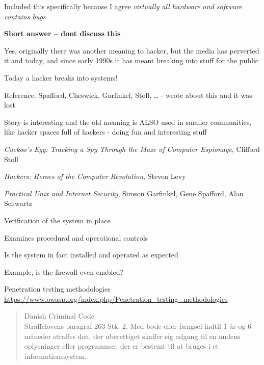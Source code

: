 \documentclass[Screen16to9,17pt]{foils}
\begin{document}
Included this specifically because I agree \emph{virtually all hardware and software contains bugs}





{\bfseries Short answer -- dont discuss this}

Yes, originally there was another meaning to hacker, but the media has perverted it and today, and since early 1990s it has meant breaking into stuff for the public

{\color{red}\hlkbig Today a hacker breaks into systems!}

Reference. Spafford, Cheswick, Garfinkel, Stoll, \ldots
- wrote about this and it was lost

Story is interesting and the old meaning is ALSO used in smaller communities, like hacker spaces full of hackers - doing fun and interesting stuff
\begin{list2}
\item \emph{Cuckoo's Egg: Tracking a Spy Through the Maze of Computer
 Espionage},  Clifford Stoll
\item \emph{Hackers: Heroes of the Computer Revolution},
Steven Levy
\item \emph{Practical Unix and Internet Security},
Simson Garfinkel, Gene Spafford, Alan Schwartz
\end{list2}





\begin{list1}
\item Verification of the system in place
\item Examines procedural and operational controls
\item Is the system in fact installed and operated as expected
\item Example, is the firewall even enabled?
\item Penetration testing methodologies\\
\url{https://www.owasp.org/index.php/Penetration_testing_methodologies}
\end{list1}




\begin{quote}\small
Danish Criminal Code\\
Straffelovens paragraf 263 Stk. 2. Med bøde eller fængsel indtil 1 år og 6 måneder straffes den, der uberettiget skaffer sig adgang til en andens oplysninger eller programmer, der er bestemt til at bruges i et informationssystem.
\end{quote}
\end{document}
